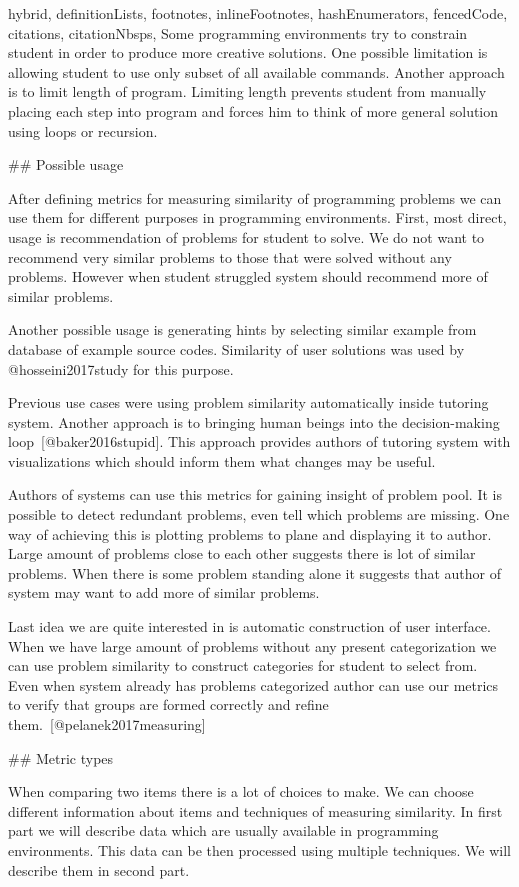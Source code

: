 \documentclass[
  digital, %
  table,   %
  nolof,     %
  nolot,     %
  nocover
]{fithesis3}
\begin{document}
\begin{markdown*}{%
  hybrid,
  definitionLists,
  footnotes,
  inlineFootnotes,
  hashEnumerators,
  fencedCode,
  citations,
  citationNbsps,
}
Some programming environments try to constrain student in order to produce more creative solutions. One possible limitation is allowing student to use only subset of all available commands. Another approach is to limit length of program. Limiting length prevents student from manually placing each step into program and forces him to think of more general solution using loops or recursion.

## Possible usage

After defining metrics for measuring similarity of programming problems we can use them for different purposes in programming environments. First, most direct, usage is recommendation of problems for student to solve. We do not want to recommend very similar problems to those that were solved without any problems. However when student struggled system should recommend more of similar problems.

Another possible usage is generating hints by selecting similar example from database of example source codes. Similarity of user solutions was used by @hosseini2017study for this purpose.

Previous use cases were using problem similarity automatically inside tutoring system. Another approach is to bringing human beings into the decision-making loop~[@baker2016stupid]. This approach provides authors of tutoring system with visualizations which should inform them what changes may be useful.

Authors of systems can use this metrics for gaining insight of problem pool. It is possible to detect redundant problems, even tell which problems are missing. One way of achieving this is plotting problems to plane and displaying it to author. Large amount of problems close to each other suggests there is lot of similar problems. When there is some problem standing alone it suggests that author of system may want to add more of similar problems.

Last idea we are quite interested in is automatic construction of user interface. When we have large amount of problems without any present categorization we can use problem similarity to construct categories for student to select from. Even when system already has problems categorized author can use our metrics to verify that groups are formed correctly and refine them.~[@pelanek2017measuring]

## Metric types

When comparing two items there is a lot of choices to make. We can choose different information about items and techniques of measuring similarity. In first part we will describe data which are usually available in programming environments. This data can be then processed using multiple techniques. We will describe them in second part.


\end{markdown*}
\end{document}
